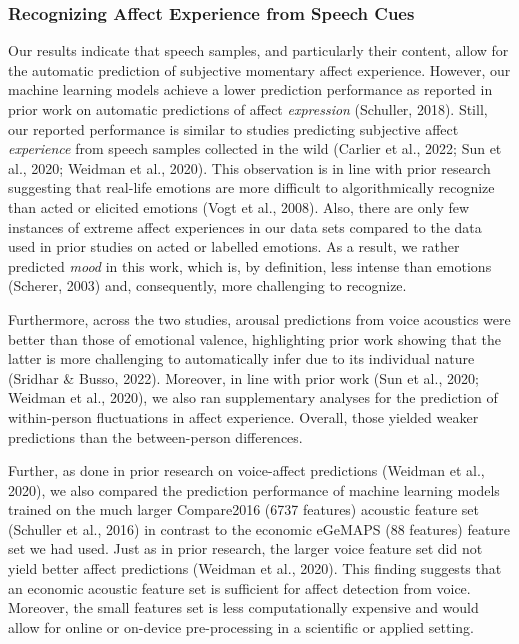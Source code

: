 \documentclass[
  man,floatsintext]{apa6}
\begin{document}
\hypertarget{recognizing-affect-experience-from-speech-cues}{%
\subsubsection{Recognizing Affect Experience from Speech Cues}\label{recognizing-affect-experience-from-speech-cues}}

Our results indicate that speech samples, and particularly their content, allow for the automatic prediction of subjective momentary affect experience. However, our machine learning models achieve a lower prediction performance as reported in prior work on automatic predictions of affect \emph{expression} (Schuller, 2018). Still, our reported performance is similar to studies predicting subjective affect \emph{experience} from speech samples collected in the wild (Carlier et al., 2022; Sun et al., 2020; Weidman et al., 2020). This observation is in line with prior research suggesting that real-life emotions are more difficult to algorithmically recognize than acted or elicited emotions (Vogt et al., 2008). Also, there are only few instances of extreme affect experiences in our data sets compared to the data used in prior studies on acted or labelled emotions. As a result, we rather predicted \emph{mood} in this work, which is, by definition, less intense than emotions (Scherer, 2003) and, consequently, more challenging to recognize.

Furthermore, across the two studies, arousal predictions from voice acoustics were better than those of emotional valence, highlighting prior work showing that the latter is more challenging to automatically infer due to its individual nature (Sridhar \& Busso, 2022). Moreover, in line with prior work (Sun et al., 2020; Weidman et al., 2020), we also ran supplementary analyses for the prediction of within-person fluctuations in affect experience. Overall, those yielded weaker predictions than the between-person differences.

Further, as done in prior research on voice-affect predictions (Weidman et al., 2020), we also compared the prediction performance of machine learning models trained on the much larger Compare2016 (6737 features) acoustic feature set (Schuller et al., 2016) in contrast to the economic eGeMAPS (88 features) feature set we had used. Just as in prior research, the larger voice feature set did not yield better affect predictions (Weidman et al., 2020). This finding suggests that an economic acoustic feature set is sufficient for affect detection from voice. Moreover, the small features set is less computationally expensive and would allow for online or on-device pre-processing in a scientific or applied setting.
\end{document}
